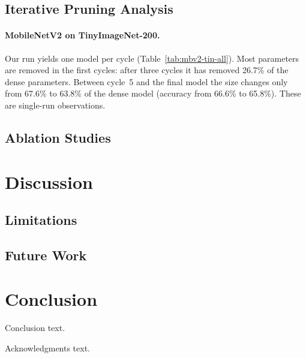 \documentclass[sigplan,screen]{acmart}
\begin{document}
\subsection{Iterative Pruning Analysis}

\paragraph{MobileNetV2 on TinyImageNet-200.}
Our run yields one model per cycle
(Table~\ref{tab:mbv2-tin-all}). Most parameters are removed in
the first cycles: after three cycles it has removed 26.7\% of the dense
parameters. Between cycle~5 and the final model the size
changes only from 67.6\% to 63.8\% of the dense model
(accuracy from 66.6\% to 65.8\%). These are single-run observations.

\subsection{Ablation Studies}



\section{Discussion}
\subsection{Limitations}
\subsection{Future Work}

\section{Conclusion}
Conclusion text.

\begin{acks}
Acknowledgments text.
\end{acks}

\clearpage



\clearpage
\appendix




\end{document}
